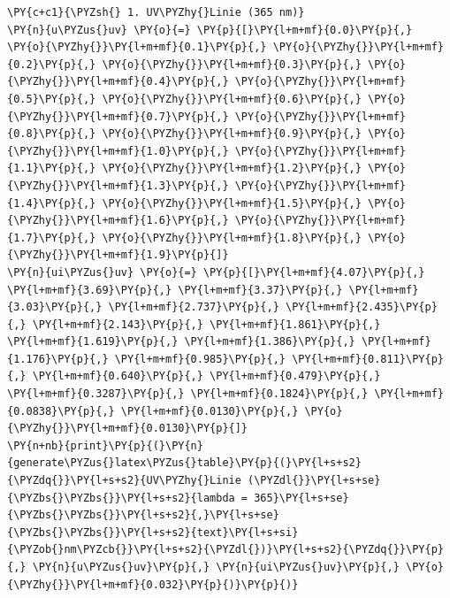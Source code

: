 \begin{tcolorbox}[breakable, size=fbox, boxrule=1pt, pad at break*=1mm,colback=cellbackground, colframe=cellborder]
\begin{Verbatim}[commandchars=\\\{\}]
\PY{c+c1}{\PYZsh{} 1. UV\PYZhy{}Linie (365 nm)}
\PY{n}{u\PYZus{}uv} \PY{o}{=} \PY{p}{[}\PY{l+m+mf}{0.0}\PY{p}{,} \PY{o}{\PYZhy{}}\PY{l+m+mf}{0.1}\PY{p}{,} \PY{o}{\PYZhy{}}\PY{l+m+mf}{0.2}\PY{p}{,} \PY{o}{\PYZhy{}}\PY{l+m+mf}{0.3}\PY{p}{,} \PY{o}{\PYZhy{}}\PY{l+m+mf}{0.4}\PY{p}{,} \PY{o}{\PYZhy{}}\PY{l+m+mf}{0.5}\PY{p}{,} \PY{o}{\PYZhy{}}\PY{l+m+mf}{0.6}\PY{p}{,} \PY{o}{\PYZhy{}}\PY{l+m+mf}{0.7}\PY{p}{,} \PY{o}{\PYZhy{}}\PY{l+m+mf}{0.8}\PY{p}{,} \PY{o}{\PYZhy{}}\PY{l+m+mf}{0.9}\PY{p}{,} \PY{o}{\PYZhy{}}\PY{l+m+mf}{1.0}\PY{p}{,} \PY{o}{\PYZhy{}}\PY{l+m+mf}{1.1}\PY{p}{,} \PY{o}{\PYZhy{}}\PY{l+m+mf}{1.2}\PY{p}{,} \PY{o}{\PYZhy{}}\PY{l+m+mf}{1.3}\PY{p}{,} \PY{o}{\PYZhy{}}\PY{l+m+mf}{1.4}\PY{p}{,} \PY{o}{\PYZhy{}}\PY{l+m+mf}{1.5}\PY{p}{,} \PY{o}{\PYZhy{}}\PY{l+m+mf}{1.6}\PY{p}{,} \PY{o}{\PYZhy{}}\PY{l+m+mf}{1.7}\PY{p}{,} \PY{o}{\PYZhy{}}\PY{l+m+mf}{1.8}\PY{p}{,} \PY{o}{\PYZhy{}}\PY{l+m+mf}{1.9}\PY{p}{]}
\PY{n}{ui\PYZus{}uv} \PY{o}{=} \PY{p}{[}\PY{l+m+mf}{4.07}\PY{p}{,} \PY{l+m+mf}{3.69}\PY{p}{,} \PY{l+m+mf}{3.37}\PY{p}{,} \PY{l+m+mf}{3.03}\PY{p}{,} \PY{l+m+mf}{2.737}\PY{p}{,} \PY{l+m+mf}{2.435}\PY{p}{,} \PY{l+m+mf}{2.143}\PY{p}{,} \PY{l+m+mf}{1.861}\PY{p}{,} \PY{l+m+mf}{1.619}\PY{p}{,} \PY{l+m+mf}{1.386}\PY{p}{,} \PY{l+m+mf}{1.176}\PY{p}{,} \PY{l+m+mf}{0.985}\PY{p}{,} \PY{l+m+mf}{0.811}\PY{p}{,} \PY{l+m+mf}{0.640}\PY{p}{,} \PY{l+m+mf}{0.479}\PY{p}{,} \PY{l+m+mf}{0.3287}\PY{p}{,} \PY{l+m+mf}{0.1824}\PY{p}{,} \PY{l+m+mf}{0.0838}\PY{p}{,} \PY{l+m+mf}{0.0130}\PY{p}{,} \PY{o}{\PYZhy{}}\PY{l+m+mf}{0.0130}\PY{p}{]}
\PY{n+nb}{print}\PY{p}{(}\PY{n}{generate\PYZus{}latex\PYZus{}table}\PY{p}{(}\PY{l+s+s2}{\PYZdq{}}\PY{l+s+s2}{UV\PYZhy{}Linie (\PYZdl{}}\PY{l+s+se}{\PYZbs{}\PYZbs{}}\PY{l+s+s2}{lambda = 365}\PY{l+s+se}{\PYZbs{}\PYZbs{}}\PY{l+s+s2}{,}\PY{l+s+se}{\PYZbs{}\PYZbs{}}\PY{l+s+s2}{text}\PY{l+s+si}{\PYZob{}nm\PYZcb{}}\PY{l+s+s2}{\PYZdl{})}\PY{l+s+s2}{\PYZdq{}}\PY{p}{,} \PY{n}{u\PYZus{}uv}\PY{p}{,} \PY{n}{ui\PYZus{}uv}\PY{p}{,} \PY{o}{\PYZhy{}}\PY{l+m+mf}{0.032}\PY{p}{)}\PY{p}{)}


\end{Verbatim}
\end{tcolorbox}
